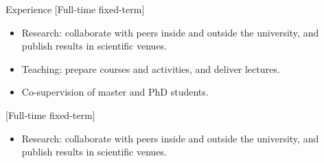 \begin{rSection}{Experience}
    [Full-time fixed-term]{%
        \begin{itemize}[nosep]
            \item Research: collaborate with peers inside and outside the university, and publish results in scientific venues.
            \item Teaching: prepare courses and activities, and deliver lectures.
            \item Co-supervision of master and PhD students.
        \end{itemize}%
    }

    [Full-time fixed-term]{%
        \begin{itemize}[nosep]
            \item Research: collaborate with peers inside and outside the university, and publish results in scientific venues.
        \end{itemize}%
    }
\end{rSection}
